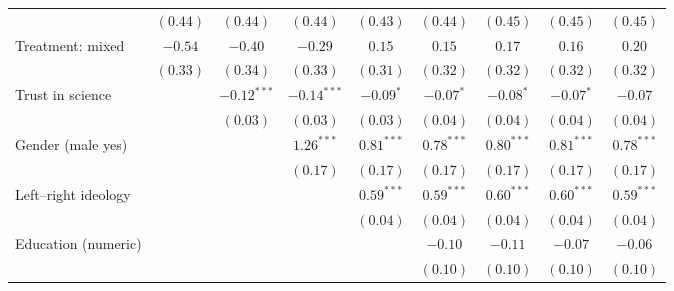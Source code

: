 \begin{table}[h]
\begin{center}
\begin{tabular}{l c c c c c c c c}
                                                                                & $(0.44)$     & $(0.44)$      & $(0.44)$      & $(0.43)$      & $(0.44)$      & $(0.45)$      & $(0.45)$      & $(0.45)$      \\
Treatment: mixed                                                                & $-0.54$      & $-0.40$       & $-0.29$       & $0.15$        & $0.15$        & $0.17$        & $0.16$        & $0.20$        \\
                                                                                & $(0.33)$     & $(0.34)$      & $(0.33)$      & $(0.31)$      & $(0.32)$      & $(0.32)$      & $(0.32)$      & $(0.32)$      \\
Trust in science                                                                &              & $-0.12^{***}$ & $-0.14^{***}$ & $-0.09^{*}$   & $-0.07^{*}$   & $-0.08^{*}$   & $-0.07^{*}$   & $-0.07$       \\
                                                                                &              & $(0.03)$      & $(0.03)$      & $(0.03)$      & $(0.04)$      & $(0.04)$      & $(0.04)$      & $(0.04)$      \\
Gender (male yes)                                                               &              &               & $1.26^{***}$  & $0.81^{***}$  & $0.78^{***}$  & $0.80^{***}$  & $0.81^{***}$  & $0.78^{***}$  \\
                                                                                &              &               & $(0.17)$      & $(0.17)$      & $(0.17)$      & $(0.17)$      & $(0.17)$      & $(0.17)$      \\
Left–right ideology                                                             &              &               &               & $0.59^{***}$  & $0.59^{***}$  & $0.60^{***}$  & $0.60^{***}$  & $0.59^{***}$  \\
                                                                                &              &               &               & $(0.04)$      & $(0.04)$      & $(0.04)$      & $(0.04)$      & $(0.04)$      \\
Education (numeric)                                                             &              &               &               &               & $-0.10$       & $-0.11$       & $-0.07$       & $-0.06$       \\
                                                                                &              &               &               &               & $(0.10)$      & $(0.10)$      & $(0.10)$      & $(0.10)$      \\

\end{tabular}
\end{center}
\end{table}
